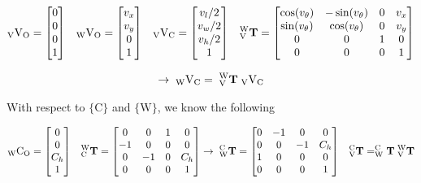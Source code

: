 \begin{align*}
    _{\textrm{V}}\textup{V}_{\textup{O}} = \begin{bmatrix}
    0 \\ 0 \\ 0 \\ 1
    \end{bmatrix}
    &&
    _{\textrm{W}}\textup{V}_{\textup{O}} = \begin{bmatrix}
    v_x \\ v_y \\ 0 \\ 1
    \end{bmatrix}
    &&
    _{\textrm{V}}\textup{V}_{\textup{C}} = \begin{bmatrix}
    v_l/2 \\ v_w/2 \\ v_h/2 \\ 1
    \end{bmatrix}
    &&
    ^{\textrm{W}}_{\textrm{V}}\mathbf{T} = \begin{bmatrix}
    \cos(v_\theta) & -\sin(v_\theta) & 0 & v_x \\
    \sin(v_\theta) & \cos(v_\theta) & 0 & v_y \\
    0 & 0 & 1 & 0 \\
    0 & 0 & 0 & 1
    \end{bmatrix}
\end{align*}

\begin{align*}
    \rightarrow \;
    _{\textrm{W}}\textup{V}_{\textup{C}} = \; ^{\textrm{W}}_{\textrm{V}}\mathbf{T} \; _{\textrm{V}}\textup{V}_{\textup{C}}
\end{align*}

With respect to $\{\textrm{C}\}$ and $\{\textrm{W}\}$, we know the following

\begin{align*}
    _{\textrm{W}}\textup{C}_{\textup{O}} = \left[\begin{matrix}0\\0\\C_{h}\\1\end{matrix}\right] &&
    ^{\textrm{W}}_{\textrm{C}}\mathbf{T} = \left[\begin{matrix}0 & 0 & 1 & 0\\-1 & 0 & 0 & 0\\0 & -1 & 0 & C_{h}\\0 & 0 & 0 & 1\end{matrix}\right]
    \rightarrow \; 
    ^{\textrm{C}}_{\textrm{W}}\mathbf{T} = \left[\begin{matrix}0 & -1 & 0 & 0\\0 & 0 & -1 & C_{h}\\1 & 0 & 0 & 0\\0 & 0 & 0 & 1\end{matrix}\right] &&
    ^{\textrm{C}}_{\textrm{V}}\mathbf{T} = ^{\textrm{C}}_{\textrm{W}}\mathbf{T} \; ^{\textrm{W}}_{\textrm{V}}\mathbf{T}
\end{align*}

